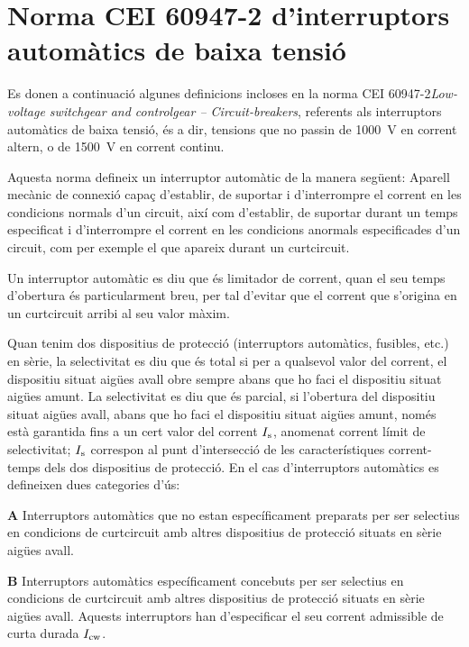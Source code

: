 \section{Norma CEI 60947-2  d'interruptors automàtics  de baixa tensió}


Es donen a continuació algunes definicions incloses en la norma CEI 60947-2\textit{Low-voltage switchgear and controlgear – Circuit-breakers}, referents als interruptors automàtics de baixa tensió, és a dir, tensions que no passin de \qty{1000}{V} en corrent altern, o de \qty{1500}{V} en corrent continu.

Aquesta norma defineix un interruptor automàtic de la manera següent: Aparell mecànic de connexió capaç d'establir, de suportar i d'interrompre el corrent en les condicions normals d'un circuit, així com d'establir, de suportar durant un temps especificat i  d'interrompre el corrent en les condicions anormals especificades d'un circuit, com per exemple el que apareix durant un curtcircuit.

Un interruptor automàtic es diu que és limitador de corrent, quan el seu temps d'obertura és particularment breu, per tal d'evitar que el corrent que s'origina en un curtcircuit arribi al seu valor màxim.

Quan tenim dos  dispositius de protecció (interruptors automàtics, fusibles, etc.) en sèrie, la selectivitat es diu que és total si per a qualsevol valor del corrent, el dispositiu situat aigües avall obre sempre abans que ho faci el dispositiu situat aigües amunt. La selectivitat es diu que és parcial, si l'obertura del dispositiu situat aigües avall, abans que ho faci el dispositiu situat aigües amunt, només està garantida fins a un cert valor del corrent $I_\mathrm{s}$, anomenat corrent límit de selectivitat; $I_\mathrm{s}$ correspon al punt d'intersecció de les característiques corrent-temps dels dos dispositius de protecció. En el cas d'interruptors automàtics es defineixen dues categories d'ús:
 \begin{list}{}
   {\setlength{\labelwidth}{10mm} \setlength{\leftmargin}{10mm} \setlength{\labelsep}{2mm}}
   \item[\textbf{A}] Interruptors automàtics que no estan específicament preparats per ser selectius en condicions de curtcircuit amb altres dispositius de protecció situats en sèrie  aigües avall.
   \item[\textbf{B}] Interruptors automàtics específicament concebuts per ser selectius en condicions de curtcircuit amb altres dispositius de protecció situats en sèrie  aigües avall. Aquests interruptors han d'especificar el seu corrent admissible de curta durada $I_\mathrm{cw}$.
\end{list}

